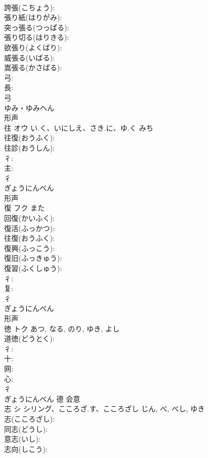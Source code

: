 \documentclass[8pt]{extreport}
\begin{document}
\begin{CJK}{UTF8}{min}
\\	誇張(こちょう): 
\\	張り紙(はりがみ): 
\\	突っ張る(つっぱる): 
\\	張り切る(はりきる): 
\\	欲張り(よくばり): 
\\	威張る(いばる): 
\\	嵩張る(かさばる): 
\\	弓: 
\\	長: 
\\	弓	
\\	ゆみ・ゆみへん	
\\	形声 
\\	往	オウ	い.く、いにしえ、さき.に、ゆ.く	みち	
\\	往復(おうふく): 
\\	往診(おうしん): 
\\	彳: 
\\	主: 
\\	彳	
\\	ぎょうにんべん	
\\	形声 
\\	復	フク	また		
\\	回復(かいふく): 
\\	復活(ふっかつ): 
\\	往復(おうふく): 
\\	復興(ふっこう): 
\\	復旧(ふっきゅう): 
\\	復習(ふくしゅう): 
\\	彳: 
\\	复: 
\\	彳	
\\	ぎょうにんべん	
\\	形声 
\\	徳	トク		あつ, なる, のり, ゆき, よし	
\\	道徳(どうとく): 
\\	彳: 
\\	十: 
\\	网: 
\\	心: 
\\	彳	
\\	ぎょうにんべん	德	会意 
\\	志	シ	シリング、こころざ.す、こころざし	じん, べ, べし, ゆき	
\\	志(こころざし): 
\\	同志(どうし): 
\\	意志(いし): 
\\	志向(しこう): 

\end{CJK}
\end{document}
